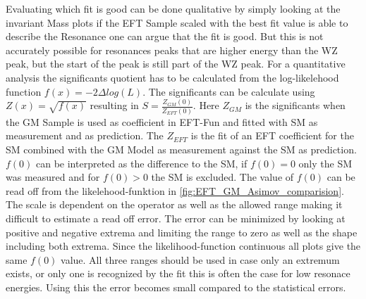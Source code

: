 \documentclass[../Bachelorarbeit.tex]{subfiles}
\begin{document}
Evaluating which fit is good can be done qualitative by simply looking at the invariant Mass plots if the EFT Sample scaled with the best fit value is able to describe
the Resonance one can argue that the fit is good. But this is not accurately possible for resonances peaks that are higher energy than the WZ peak, but the start of the peak is still part of the WZ peak.
For a quantitative analysis the significants quotient has to be calculated from the log-likelehood function $f(x)=-2\Delta log(L)$.
The significants can be calculate using $Z(x)=\sqrt{f(x)}$ resulting in $S = \frac{Z_{GM}(0)}{Z_{EFT}(0)}$.
Here $Z_{GM}$ is the significants when the GM Sample is used as coefficient in EFT-Fun and fitted with SM as measurement and as prediction.
The $Z_{EFT}$ is the fit of an EFT coefficient for the SM combined with the GM Model as measurement against the SM as prediction.
$f(0)$ can be interpreted as the difference to the SM, if $f(0) = 0$ only the SM was measured and for $f(0) > 0$ the SM is excluded.
The value of $f(0)$ can be read off from the likelehood-funktion in \ref{fig:EFT_GM_Asimov_comparision}. The scale is dependent on
the operator as well as the allowed range making it difficult to estimate a read off error. The error can be minimized by looking at positive and negative extrema and limiting the range to zero as well as the shape including both extrema.
Since the likelihood-function continuous all plots give the same $f(0)$ value. All three ranges should be used in case only an extremum exists, or only one is recognized by the fit this is often the case for low resonace energies.
Using this the error becomes small compared to the statistical errors. 
\end{document}
